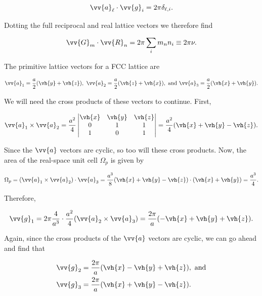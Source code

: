 \begin{parts}
  \begin{equation}
    \vv{a}_\ell \cdot \vv{g}_i = 2\pi \delta_{\ell,i}.
  \end{equation}

  Dotting the full reciprocal and real lattice vectors we therefore find

  \begin{equation}
    \vv{G}_m \cdot \vv{R}_n = 2\pi \sum_i m_nn_i \equiv 2\pi\nu.
  \end{equation}



\item The primitive lattice vectors for a FCC lattice are

  \begin{equation}
    \vv{a}_1 = \frac{a}{2}(\vh{y} + \vh{z}),\ \vv{a}_2 = \frac{a}{2}(\vh{z} + \vh{x}),\ \text{and}\ \vv{a}_3 = \frac{a}{2}(\vh{x} + \vh{y}).
  \end{equation}

  We will need the cross products of these vectors to continue. First,

  \begin{equation}
    \vv{a}_1 \times \vv{a}_2 = \frac{a^2}{4} \begin{vmatrix} \vh{x} & \vh{y} & \vh{z} \\ 0 & 1 & 1 \\ 1 & 0 & 1 \end{vmatrix} = \frac{a^2}{4}(\vh{x} + \vh{y} - \vh{z}).
  \end{equation}

  Since the $\vv{a}$ vectors are cyclic, so too will these cross products. Now, the area of the real-space unit cell $\Omega_p$ is given by

  \begin{equation}
    \Omega_p = (\vv{a}_1 \times \vv{a}_2) \cdot \vv{a}_3 = \frac{a^3}{8}(\vh{x} + \vh{y} - \vh{z})\cdot(\vh{x} + \vh{y}) = \frac{a^3}{4}.
  \end{equation}

  Therefore,

  \begin{equation}
    \vv{g}_1 = 2\pi \frac{4}{a^3} \cdot \frac{a^2}{4} (\vv{a}_2 \times \vv{a}_3) = \frac{2\pi}{a} (-\vh{x} + \vh{y} + \vh{z}).
  \end{equation}

  Again, since the cross products of the $\vv{a}$ vectors are cyclic, we can go ahead and find that

  \begin{align}
    \vv{g}_2 &= \frac{2\pi}{a} (\vh{x} - \vh{y} + \vh{z}),\ \text{and} \\
    \vv{g}_3 &= \frac{2\pi}{a} (\vh{x} + \vh{y} - \vh{z}).
  \end{align}


\end{parts}
